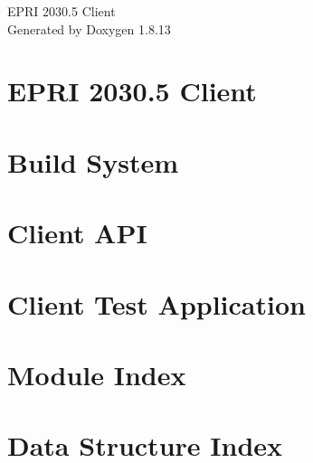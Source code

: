 \documentclass[twoside]{book}
\newcommand{\+}{\discretionary{\mbox{\scriptsize$\hookleftarrow$}}{}{}}
\newcommand{\clearemptydoublepage}{%
  \newpage{\pagestyle{empty}\cleardoublepage}%
}
\begin{document}
\hypersetup{pageanchor=false,
             bookmarksnumbered=true,
             pdfencoding=unicode
            }
\begin{titlepage}
\vspace*{7cm}
\begin{center}%
{\Large E\+P\+RI 2030.5 Client }\\
\vspace*{1cm}
{\large Generated by Doxygen 1.8.13}\\
\end{center}
\end{titlepage}
\clearemptydoublepage
{}
\tableofcontents
\clearemptydoublepage
{}
\hypersetup{pageanchor=true}

\chapter{E\+P\+RI 2030.5 Client}
\label{index}\hypertarget{index}{}
\chapter{Build System}
\label{md_build}

\chapter{Client A\+PI}
\label{md_client}

\chapter{Client Test Application}
\label{md_client_test}

\chapter{Module Index}

\chapter{Data Structure Index}

\end{document}
